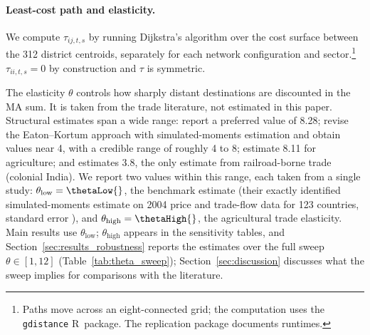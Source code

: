 \paragraph{Least-cost path and elasticity.}
We compute $\tau_{ij,t,s}$ by running Dijkstra's algorithm over the
cost surface between the 312 district centroids, separately for each
network configuration and sector.\footnote{Paths move across an
eight-connected grid; the computation uses the \texttt{gdistance}
R~package. The replication package documents runtimes.}
$\tau_{ii,t,s}=0$ by construction and $\tau$ is symmetric.

The elasticity $\theta$ controls how sharply distant destinations are
discounted in the MA sum. It is taken from the trade literature, not
estimated in this paper. Structural
estimates span a wide range: \citet{eatonkortum2002} report a
preferred value of 8.28; \citet{simonovskawaugh2014} revise the
Eaton--Kortum approach with simulated-moments estimation and obtain
values near 4, with a credible range of roughly 4 to 8;
\citet{caliendoparro2015} estimate 8.11 for agriculture; and
\citet{donaldson2018} estimates 3.8, the only estimate from
railroad-borne trade (colonial India). We report
two values within this range, each taken from a single study:
$\theta_{\mathrm{low}} = \thetaLow{}$, the \citet{simonovskawaugh2014}
benchmark estimate (their exactly identified simulated-moments estimate
on 2004 price and trade-flow data for 123 countries, standard error
\thetaLowSE{}), and $\theta_{\mathrm{high}} = \thetaHigh{}$, the
\citet{caliendoparro2015} agricultural trade elasticity. Main results use
$\theta_{\mathrm{low}}$; $\theta_{\mathrm{high}}$
appears in the sensitivity tables, and
Section~\ref{sec:results_robustness} reports the estimates over the
full sweep $\theta \in [1, 12]$ (Table~\ref{tab:theta_sweep});
Section~\ref{sec:discussion} discusses what the sweep implies for
comparisons with the literature.

